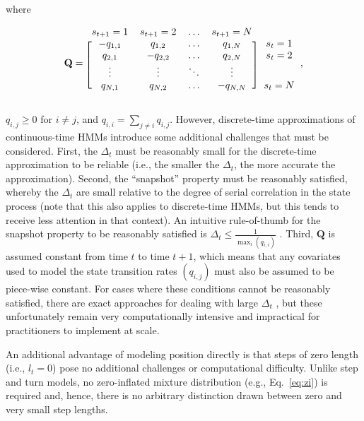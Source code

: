 \documentclass[12pt]{article}\usepackage[]{graphicx}\usepackage[]{xcolor}
\begin{document}
where
\begin{linenomath*}
\begin{equation}
 \mathbf{Q} = \begin{blockarray}{ccccc}
    s_{t+1}=1 & s_{t+1}=2 & \hdots & s_{t+1}=N & \\
    \begin{block}{[cccc]c}
    -q_{1,1} & q_{1,2} & \hdots & q_{1,N} & s_t=1 \\
    q_{2,1} & -q_{2,2} & \hdots & q_{2,N} & s_t=2 \\
    \vdots & \vdots   & \ddots & \vdots  & \\
    q_{N,1} & q_{N,2} & \hdots & -q_{N,N} & s_t=N \\
    \end{block}
    \end{blockarray},
\end{equation}
\end{linenomath*}
$q_{i,j} \ge 0$ for $i \ne j$, and $q_{i,i}=\sum_{j \ne i} q_{i,j}$. However, discrete-time approximations of continuous-time HMMs introduce some additional challenges that must be considered. First, the $\Delta_t$ must be reasonably small for the discrete-time approximation to be reliable (i.e., the smaller the $\Delta_t$, the more accurate the approximation). Second, the ``snapshot'' property must be reasonably satisfied, whereby the $\Delta_t$ are small relative to the degree of serial correlation in the state process (note that this also applies to discrete-time HMMs, but this tends to receive less attention in that context). An intuitive rule-of-thumb for the snapshot property to be reasonably satisfied is $\Delta_t \le \frac{1}{\max_i\left(q_{i,i}\right)}$ \citep[][]{glennie2023hidden,McClintockLander2024}. Third, $\mathbf{Q}$ is assumed constant from time $t$ to time $t+1$, which means that any covariates used to model the state transition rates $\left(q_{i,j}\right)$ must also be assumed to be piece-wise constant. For cases where these conditions cannot be reasonably satisfied, there are exact approaches for dealing with large $\Delta_t$ \citep[e.g.,][]{BlackwellEtAl2016}, but these unfortunately remain very computationally intensive and impractical for practitioners to implement at scale.

An additional advantage of modeling position directly is that steps of zero length (i.e., $l_t=0$) pose no additional challenges or computational difficulty. Unlike step and turn models, no zero-inflated mixture distribution (e.g., Eq.\ \ref{eq:zi}) is required and, hence, there is no arbitrary distinction drawn between zero and very small step lengths. 
\end{document}
